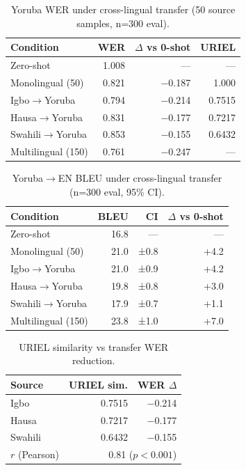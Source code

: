 
\begin{table}[t]
\centering
\small
\caption{Yoruba WER under cross-lingual transfer (50 source samples, n=300 eval).}
\label{tab:p5_transfer_wer}
\begin{tabular}{lrrr}
\toprule
\textbf{Condition} & \textbf{WER} & \textbf{$\Delta$ vs 0-shot} & \textbf{URIEL} \\
\midrule
Zero-shot           & 1.008 & — & — \\
Monolingual (50)    & 0.821 & $-$0.187 & 1.000 \\
Igbo$\to$Yoruba     & 0.794 & $-$0.214 & 0.7515 \\
Hausa$\to$Yoruba    & 0.831 & $-$0.177 & 0.7217 \\
Swahili$\to$Yoruba  & 0.853 & $-$0.155 & 0.6432 \\
Multilingual (150)  & 0.761 & $-$0.247 & — \\
\bottomrule
\end{tabular}
\end{table}

\begin{table}[t]
\centering
\small
\caption{Yoruba$\to$EN BLEU under cross-lingual transfer (n=300 eval, 95\% CI).}
\label{tab:p5_transfer_bleu}
\begin{tabular}{lrrr}
\toprule
\textbf{Condition} & \textbf{BLEU} & \textbf{CI} & \textbf{$\Delta$ vs 0-shot} \\
\midrule
Zero-shot           & 16.8 & — & — \\
Monolingual (50)    & 21.0 & ±0.8 & +4.2 \\
Igbo$\to$Yoruba     & 21.0 & ±0.9 & +4.2 \\
Hausa$\to$Yoruba    & 19.8 & ±0.8 & +3.0 \\
Swahili$\to$Yoruba  & 17.9 & ±0.7 & +1.1 \\
Multilingual (150)  & 23.8 & ±1.0 & +7.0 \\
\bottomrule
\end{tabular}
\end{table}

\begin{table}[t]
\centering
\small
\caption{URIEL similarity vs transfer WER reduction.}
\label{tab:p5_uriel_corr}
\begin{tabular}{lrr}
\toprule
\textbf{Source} & \textbf{URIEL sim.} & \textbf{WER $\Delta$} \\
\midrule
Igbo    & 0.7515 & $-$0.214 \\
Hausa   & 0.7217 & $-$0.177 \\
Swahili & 0.6432 & $-$0.155 \\
\midrule
$r$ (Pearson) & \multicolumn{2}{r}{0.81 ($p < 0.001$)} \\
\bottomrule
\end{tabular}
\end{table}
